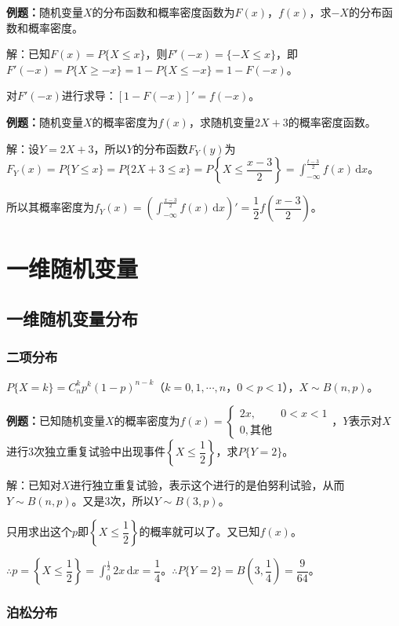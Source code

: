 \textbf{例题：}随机变量$X$的分布函数和概率密度函数为$F(x)$，$f(x)$，求$-X$的分布函数和概率密度。

解：已知$F(x)=P\{X\leqslant x\}$，则$F'(-x)=\{-X\leqslant x\}$，即$F'(-x)=P\{X\geqslant-x\}=1-P\{X\leqslant-x\}=1-F(-x)$。

对$F'(-x)$进行求导：$[1-F(-x)]'=f(-x)$。

\textbf{例题：}随机变量$X$的概率密度为$f(x)$，求随机变量$2X+3$的概率密度函数。

解：设$Y=2X+3$，所以$Y$的分布函数$F_Y(y)$为$F_Y(x)=P\{Y\leqslant x\}=P\{2X+3\leqslant x\}=P\left\{X\leqslant\dfrac{x-3}{2}\right\}=\int_{-\infty}^{\frac{t-3}{2}}f(x)\,\textrm{d}x$。

所以其概率密度为$f_Y(x)=(\int_{-\infty}^{\frac{x-3}{2}}f(x)\,\textrm{d}x)'=\dfrac{1}{2}f\left(\dfrac{x-3}{2}\right)$。

\section{一维随机变量}

\subsection{一维随机变量分布}

\subsubsection{二项分布}

$P\{X=k\}=C_n^kp^k(1-p)^{n-k}$（$k=0,1,\cdots,n$，$0<p<1$），$X\sim B(n,p)$。

\textbf{例题：}已知随机变量$X$的概率密度为$f(x)=\left\{\begin{array}{ll}
    2x, & 0<x<1 \\
    0, \text{其他}
\end{array}\right.$，$Y$表示对$X$进行3次独立重复试验中出现事件$\left\{X\leqslant\dfrac{1}{2}\right\}$，求$P\{Y=2\}$。\medskip

解：已知对$X$进行独立重复试验，表示这个进行的是伯努利试验，从而$Y\sim B(n,p)$。又是3次，所以$Y\sim B(3,p)$。

只用求出这个$p$即$\left\{X\leqslant\dfrac{1}{2}\right\}$的概率就可以了。又已知$f(x)$。

$\therefore p=\left\{X\leqslant\dfrac{1}{2}\right\}=\int_0^\frac{1}{2}2x\,\textrm{d}x=\dfrac{1}{4}$。$\therefore P\{Y=2\}=B\left(3,\dfrac{1}{4}\right)=\dfrac{9}{64}$。

\subsubsection{泊松分布}

